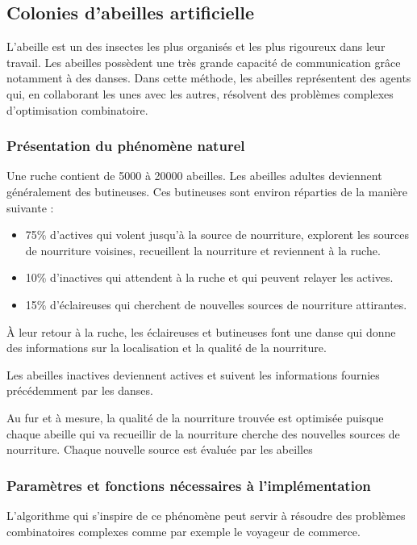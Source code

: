 \documentclass[12pt]{article}
\begin{document}
\subsection{Colonies d'abeilles artificielle \cite{abeilles}}
 L'abeille est un des insectes les plus organisés et les plus rigoureux dans leur travail. Les abeilles possèdent une très grande capacité de communication grâce notamment à des danses. Dans cette méthode, les abeilles représentent des agents qui, en collaborant les unes avec les autres, résolvent des problèmes complexes d'optimisation combinatoire.
 
\subsubsection{Présentation du phénomène naturel}
Une ruche contient de 5000 à 20000 abeilles. Les abeilles adultes deviennent généralement des butineuses. 
Ces butineuses sont environ réparties de la manière suivante : 
\begin{itemize}
   \item 75\% d'actives qui volent jusqu'à la source de nourriture, explorent les sources de nourriture voisines, recueillent la nourriture et reviennent à la ruche.
   \item 10\% d'inactives qui attendent à la ruche et qui peuvent relayer les actives. 
   \item 15\% d'éclaireuses qui cherchent de nouvelles sources de nourriture attirantes. 
\end{itemize}

À leur retour à la ruche, les éclaireuses et butineuses font une danse qui donne des informations sur la localisation et la qualité de la nourriture. 

Les abeilles inactives deviennent actives et suivent les informations fournies précédemment par les danses. 

Au fur et à mesure, la qualité de la nourriture trouvée est optimisée puisque chaque abeille qui va recueillir de la nourriture cherche des nouvelles sources de nourriture. Chaque nouvelle source est évaluée par les abeilles 
\subsubsection{Paramètres et fonctions nécessaires à l'implémentation}

L'algorithme qui s'inspire de ce phénomène peut servir à résoudre des problèmes combinatoires complexes comme par exemple le voyageur de commerce. 
\end{document}
